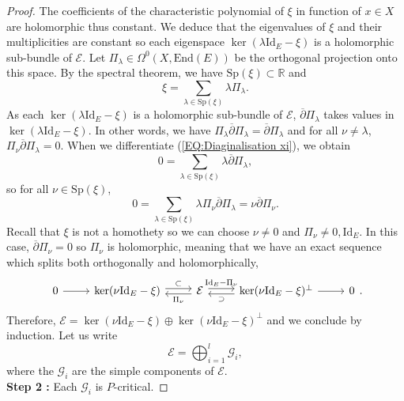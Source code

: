 \documentclass{article}
\theoremstyle{remark}
\theoremstyle{definition}
\newcommand{\R}{\mathbb{R}}
\newcommand{\End}{\mathrm{End}}
\newcommand{\Id}{\mathrm{Id}}
\newcommand{\E}{\mathcal{E}}
\newcommand{\G}{\mathcal{G}}
\newcommand{\dbar}{\overline{\partial}}
\begin{document}
\begin{proof}
The coefficients of the characteristic polynomial of $\xi$ in function of $x \in X$ are holomorphic thus constant. We deduce that the eigenvalues of $\xi$ and their multiplicities are constant so each eigenspace $\ker(\lambda\Id_E - \xi)$ is a holomorphic sub-bundle of $\E$. Let $\Pi_\lambda \in \Omega^0(X,\End(E))$ be the orthogonal projection onto this space. By the spectral theorem, we have $\mathrm{Sp}(\xi) \subset \R$ and
\begin{equation}\label{EQ:Diaginalisation xi}
    \xi = \sum_{\lambda \in \mathrm{Sp}(\xi)} \lambda\Pi_\lambda.
\end{equation}
As each $\ker(\lambda\Id_E - \xi)$ is a holomorphic sub-bundle of $\E$, $\dbar\Pi_\lambda$ takes values in $\ker(\lambda\Id_E - \xi)$. In other words, we have $\Pi_\lambda\dbar\Pi_\lambda = \dbar\Pi_\lambda$ and for all $\nu \neq \lambda$, $\Pi_\nu\dbar\Pi_\lambda = 0$. When we differentiate (\ref{EQ:Diaginalisation xi}), we obtain
$$
0 = \sum_{\lambda \in \mathrm{Sp}(\xi)} \lambda\dbar\Pi_\lambda,
$$
so for all $\nu \in \mathrm{Sp}(\xi)$,
$$
0 = \sum_{\lambda \in \mathrm{Sp}(\xi)} \lambda\Pi_\nu\dbar\Pi_\lambda = \nu\dbar\Pi_\nu.
$$
Recall that $\xi$ is not a homothety so we can choose $\nu \neq 0$ and $\Pi_\nu \neq 0,\Id_E$. In this case, $\dbar\Pi_\nu = 0$ so $\Pi_\nu$ is holomorphic, meaning that we have an exact sequence which splits both orthogonally and holomorphically,
$$
\begin{tikzcd}
    0 \ar{r} & \ker(\nu\Id_E - \xi) \ar["\subset",shift left]{r} & \E \ar["\Pi_\nu",shift left]{l}\ar["\Id_E - \Pi_\nu",shift left]{r} & \ker(\nu\Id_E - \xi)^\bot \ar["\supset",shift left]{l}\ar{r} & 0
\end{tikzcd}.
$$
Therefore, $\E = \ker(\nu\Id_E - \xi) \oplus \ker(\nu\Id_E - \xi)^\bot$ and we conclude by induction. Let us write
$$
\E = \bigoplus_{i = 1}^l \G_i,
$$
where the $\G_i$ are the simple components of $\E$.\\

\noindent\textbf{Step 2 :} Each $\G_i$ is $P$-critical.


\end{proof}
\end{document}
